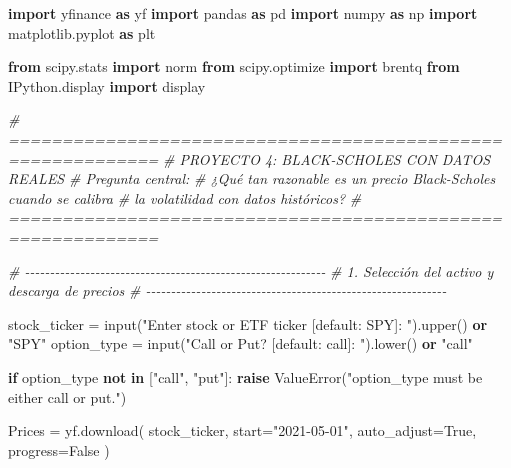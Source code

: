 \documentclass[
  11pt,
]{article}
\newenvironment{Shaded}{}{}
\newcommand{\BuiltInTok}[1]{\textcolor[rgb]{0.00,0.50,0.00}{#1}}
\newcommand{\CommentTok}[1]{\textcolor[rgb]{0.38,0.63,0.69}{\textit{#1}}}
\newcommand{\ControlFlowTok}[1]{\textcolor[rgb]{0.00,0.44,0.13}{\textbf{#1}}}
\newcommand{\ImportTok}[1]{\textcolor[rgb]{0.00,0.50,0.00}{\textbf{#1}}}
\newcommand{\KeywordTok}[1]{\textcolor[rgb]{0.00,0.44,0.13}{\textbf{#1}}}
\newcommand{\NormalTok}[1]{#1}
\newcommand{\OperatorTok}[1]{\textcolor[rgb]{0.40,0.40,0.40}{#1}}
\newcommand{\PreprocessorTok}[1]{\textcolor[rgb]{0.74,0.48,0.00}{#1}}
\newcommand{\StringTok}[1]{\textcolor[rgb]{0.25,0.44,0.63}{#1}}
\newcommand{\VariableTok}[1]{\textcolor[rgb]{0.10,0.09,0.49}{#1}}
\begin{document}
\begin{Shaded}
\begin{Highlighting}[]
\ImportTok{import}\NormalTok{ yfinance }\ImportTok{as}\NormalTok{ yf}
\ImportTok{import}\NormalTok{ pandas }\ImportTok{as}\NormalTok{ pd}
\ImportTok{import}\NormalTok{ numpy }\ImportTok{as}\NormalTok{ np}
\ImportTok{import}\NormalTok{ matplotlib.pyplot }\ImportTok{as}\NormalTok{ plt}

\ImportTok{from}\NormalTok{ scipy.stats }\ImportTok{import}\NormalTok{ norm}
\ImportTok{from}\NormalTok{ scipy.optimize }\ImportTok{import}\NormalTok{ brentq}
\ImportTok{from}\NormalTok{ IPython.display }\ImportTok{import}\NormalTok{ display}


\CommentTok{\# ============================================================}
\CommentTok{\# PROYECTO 4: BLACK{-}SCHOLES CON DATOS REALES}
\CommentTok{\# Pregunta central:}
\CommentTok{\# ¿Qué tan razonable es un precio Black{-}Scholes cuando se calibra}
\CommentTok{\# la volatilidad con datos históricos?}
\CommentTok{\# ============================================================}

\CommentTok{\# {-}{-}{-}{-}{-}{-}{-}{-}{-}{-}{-}{-}{-}{-}{-}{-}{-}{-}{-}{-}{-}{-}{-}{-}{-}{-}{-}{-}{-}{-}{-}{-}{-}{-}{-}{-}{-}{-}{-}{-}{-}{-}{-}{-}{-}{-}{-}{-}{-}{-}{-}{-}{-}{-}{-}{-}{-}{-}{-}{-}}
\CommentTok{\# 1. Selección del activo y descarga de precios}
\CommentTok{\# {-}{-}{-}{-}{-}{-}{-}{-}{-}{-}{-}{-}{-}{-}{-}{-}{-}{-}{-}{-}{-}{-}{-}{-}{-}{-}{-}{-}{-}{-}{-}{-}{-}{-}{-}{-}{-}{-}{-}{-}{-}{-}{-}{-}{-}{-}{-}{-}{-}{-}{-}{-}{-}{-}{-}{-}{-}{-}{-}{-}}

\NormalTok{stock\_ticker }\OperatorTok{=} \BuiltInTok{input}\NormalTok{(}\StringTok{"Enter stock or ETF ticker [default: SPY]: "}\NormalTok{).upper() }\KeywordTok{or} \StringTok{"SPY"}
\NormalTok{option\_type }\OperatorTok{=} \BuiltInTok{input}\NormalTok{(}\StringTok{"Call or Put? [default: call]: "}\NormalTok{).lower() }\KeywordTok{or} \StringTok{"call"}

\ControlFlowTok{if}\NormalTok{ option\_type }\KeywordTok{not} \KeywordTok{in}\NormalTok{ [}\StringTok{"call"}\NormalTok{, }\StringTok{"put"}\NormalTok{]:}
    \ControlFlowTok{raise} \PreprocessorTok{ValueError}\NormalTok{(}\StringTok{"option\_type must be either \textquotesingle{}call\textquotesingle{} or \textquotesingle{}put\textquotesingle{}."}\NormalTok{)}

\NormalTok{Prices }\OperatorTok{=}\NormalTok{ yf.download(}
\NormalTok{    stock\_ticker,}
\NormalTok{    start}\OperatorTok{=}\StringTok{"2021{-}05{-}01"}\NormalTok{,}
\NormalTok{    auto\_adjust}\OperatorTok{=}\VariableTok{True}\NormalTok{,}
\NormalTok{    progress}\OperatorTok{=}\VariableTok{False}
\NormalTok{)}


\end{Highlighting}
\end{Shaded}
\end{document}
